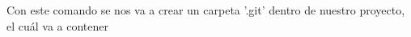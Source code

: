 Con este comando se nos va a crear un carpeta '.git' dentro de nuestro proyecto, el cuál va a contener



















































%
%		































